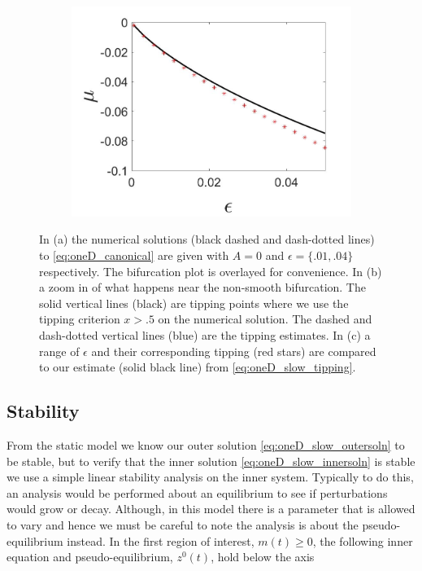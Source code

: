 \begin{figure}[H]
\begin{subfigure}{.5\textwidth}
\includegraphics[width=\linewidth]{oneD/slow_epscomp.jpg}
\caption{}
\label{fig:oneD_slow_comp}
\end{subfigure}
\caption{In (a) the numerical solutions (black dashed and dash-dotted lines) to \eqref{eq:oneD_canonical} are given with $A=0$ and $\epsilon=\{.01,.04\}$ respectively. The bifurcation plot is overlayed for convenience. In (b) a zoom in of what happens near the non-smooth bifurcation. The solid vertical lines (black) are tipping points where we use the tipping criterion $x>.5$ on the numerical solution. The dashed and dash-dotted vertical lines (blue) are the tipping estimates. In (c) a range of $\epsilon$ and their corresponding tipping (red stars) are compared to our estimate (solid black line) from \eqref{eq:oneD_slow_tipping}.}
\label{fig:oneD_slow_numerics}
\end{figure}


\subsection{Stability}
From the static model we know our outer solution \eqref{eq:oneD_slow_outersoln} to be stable, but to verify that the inner solution \eqref{eq:oneD_slow_innersoln} is stable we use a simple linear stability analysis on the inner system. Typically to do this, an analysis would be performed about an equilibrium to see if perturbations would grow or decay. Although, in this model there is a parameter that is allowed to vary and hence we must be careful to note the analysis is about the pseudo-equilibrium instead. In the first region of interest, $m(t)\ge 0$, the following inner equation and pseudo-equilibrium, $z^0(t)$, hold below the axis

